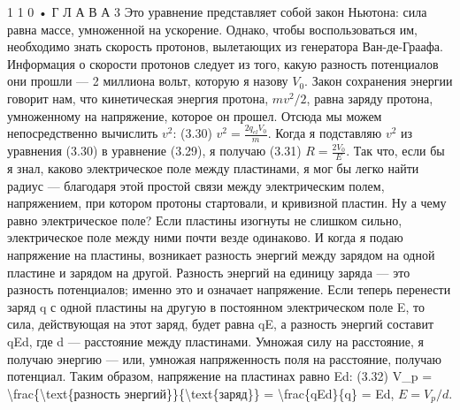 \documentclass[10pt,oneside]{article}
\begin{document}
1 1 0 • Г Л А В А  3 Это уравнение представляет собой закон Ньютона: сила равна массе, умноженной на ускорение. Однако, чтобы воспользоваться им, необходимо знать скорость протонов, вылетающих из генератора Ван-де-Граафа. Информация о скорости протонов следует из того, какую разность потенциалов они прошли --- 2 миллиона вольт, которую я назову \(V_0\). Закон сохранения энергии говорит нам, что кинетическая энергия протона, \(mv^2/2\), равна заряду протона, умноженному на напряжение, которое он прошел. Отсюда мы можем непосредственно вычислить \(v^2\): (3.30) \(v^2 = \frac{2 q_{el} V_0}{m}\). Когда я подставляю \(v^2\) из уравнения (3.30) в уравнение (3.29), я получаю (3.31) \(R = \frac{2 V_0}{E}\). Так что, если бы я знал, каково электрическое поле между пластинами, я мог бы легко найти радиус --- благодаря этой простой связи между электрическим полем, напряжением, при котором протоны стартовали, и кривизной пластин. Ну а чему равно электрическое поле? Если пластины изогнуты не слишком сильно, электрическое поле между ними почти везде одинаково. И когда я подаю напряжение на пластины, возникает разность энергий между зарядом на одной пластине и зарядом на другой. Разность энергий на единицу заряда --- это разность потенциалов; именно это и означает напряжение. Если теперь перенести заряд q с одной пластины на другую в постоянном электрическом поле E, то сила, действующая на этот заряд, будет равна qE, а разность энергий составит qEd, где d --- расстояние между пластинами. Умножая силу на расстояние, я получаю энергию --- или, умножая напряженность поля на расстояние, получаю потенциал. Таким образом, напряжение на пластинах равно Ed: (3.32) V\_p = \textbackslash{}frac\{\textbackslash{}text\{разность энергий\}\}\{\textbackslash{}text\{заряд\}\} = \textbackslash{}frac\{qEd\}\{q\} = Ed, \(E = V_p/d\).\par
\end{document}
